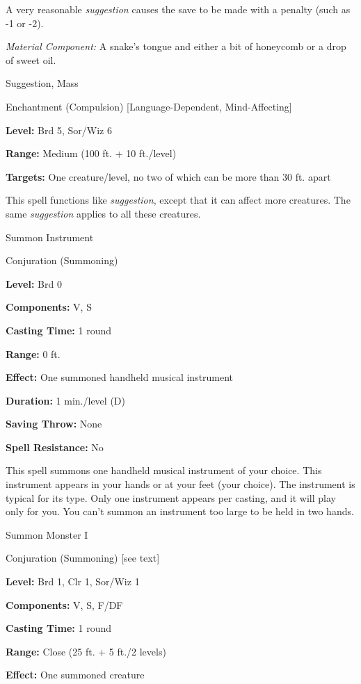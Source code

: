 \documentclass{article}
\begin{document}
A very reasonable \textit{suggestion }causes the save to be made with a penalty 
(such as -1 or -2).

\textit{Material Component: }A snake's tongue and either a bit of honeycomb or 
a drop of sweet oil.

\vspace{12pt}
Suggestion, Mass

Enchantment (Compulsion) [Language-Dependent, Mind-Affecting]

\textbf{Level:} Brd 5, Sor/Wiz 6

\textbf{Range: }Medium (100 ft. + 10 ft./level)

\textbf{Targets:} One creature/level, no two of which can be more than 30 ft. apart

This spell functions like \textit{suggestion}, except that it can affect more creatures. 
The same \textit{suggestion }applies to all these creatures.

\vspace{12pt}
Summon Instrument

Conjuration (Summoning)

\textbf{Level:} Brd 0

\textbf{Components:} V, S

\textbf{Casting Time:} 1 round

\textbf{Range:} 0 ft.

\textbf{Effect:} One summoned handheld musical instrument

\textbf{Duration:} 1 min./level (D)

\textbf{Saving Throw:} None

\textbf{Spell Resistance:} No

This spell summons one handheld musical instrument of your choice. This instrument 
appears in your hands or at your feet (your choice). The instrument is typical 
for its type. Only one instrument appears per casting, and it will play only for 
you. You can't summon an instrument too large to be held in two hands.

\vspace{12pt}
Summon Monster I

Conjuration (Summoning) [see text]

\textbf{Level:} Brd 1, Clr 1, Sor/Wiz 1

\textbf{Components:} V, S, F/DF

\textbf{Casting Time:} 1 round

\textbf{Range:} Close (25 ft. + 5 ft./2 levels)

\textbf{Effect:} One summoned creature
\end{document}
